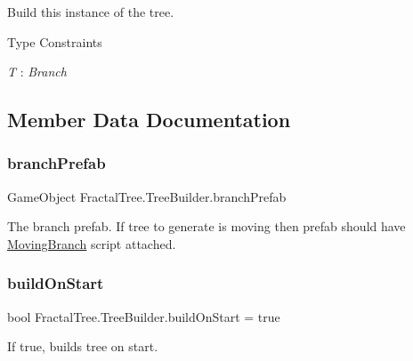Build this instance of the tree. 

\begin{Desc}
\item[Type Constraints]\begin{description}
\item[{\em T} : {\em Branch}]\end{description}
\end{Desc}


\subsection{Member Data Documentation}
\hypertarget{class_fractal_tree_1_1_tree_builder_a3cc99e5fd404b3916dc29f5dc5223d8c}{}\label{class_fractal_tree_1_1_tree_builder_a3cc99e5fd404b3916dc29f5dc5223d8c} 
\subsubsection{\texorpdfstring{branch\+Prefab}{branchPrefab}}
{\footnotesize\ttfamily Game\+Object Fractal\+Tree.\+Tree\+Builder.\+branch\+Prefab}



The branch prefab. If tree to generate is moving then prefab should have \hyperlink{interface_fractal_tree_1_1_moving_branch}{Moving\+Branch} script attached. 

\hypertarget{class_fractal_tree_1_1_tree_builder_a430c3374fd2e1302f232d08bca9558b2}{}\label{class_fractal_tree_1_1_tree_builder_a430c3374fd2e1302f232d08bca9558b2} 
\subsubsection{\texorpdfstring{build\+On\+Start}{buildOnStart}}
{\footnotesize\ttfamily bool Fractal\+Tree.\+Tree\+Builder.\+build\+On\+Start = true}



If true, builds tree on start. 

\hypertarget{class_fractal_tree_1_1_tree_builder_a1cd91a1a14415505680fa2deae9468ca}{}\label{class_fractal_tree_1_1_tree_builder_a1cd91a1a14415505680fa2deae9468ca} 
